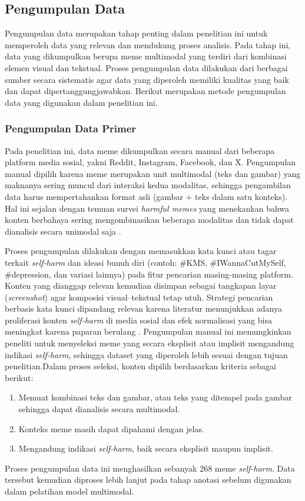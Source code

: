 \subsection{Pengumpulan Data} \label{subsec:pengumpulan_data}
Pengumpulan data merupakan tahap penting dalam penelitian ini untuk memperoleh data yang relevan dan mendukung proses analisis. Pada tahap ini, data yang dikumpulkan berupa meme multimodal yang terdiri dari kombinasi elemen visual dan tekstual. Proses pengumpulan data dilakukan dari berbagai sumber secara sistematis agar data yang diperoleh memiliki kualitas yang baik dan dapat dipertanggungjawabkan. Berikut merupakan metode pengumpulan data yang digunakan dalam penelitian ini.

\subsubsection{Pengumpulan Data Primer} \label{subsubsec:pengumpulan_data_primer}
Pada penelitian ini, data meme dikumpulkan secara manual dari beberapa platform media sosial, yakni Reddit, Instagram, Facebook, dan X. Pengumpulan manual dipilih karena meme merupakan unit multimodal (teks dan gambar) yang maknanya sering muncul dari interaksi kedua modalitas, sehingga pengambilan data harus mempertahankan format asli (gambar + teks dalam satu konteks). Hal ini sejalan dengan temuan survei \textit{harmful memes} yang menekankan bahwa konten berbahaya sering mengombinasikan beberapa modalitas dan tidak dapat dianalisis secara unimodal saja \cite{Sharma2022HarmfulMemes}.

Proses pengumpulan dilakukan dengan memasukkan kata kunci atau tagar terkait \textit{self-harm} dan ideasi bunuh diri (contoh: \#KMS, \#IWannaCutMySelf, \#depression, dan variasi lainnya) pada fitur pencarian masing-masing platform. Konten yang dianggap relevan kemudian disimpan sebagai tangkapan layar (\textit{screenshot}) agar komposisi visual--tekstual tetap utuh. Strategi pencarian berbasis kata kunci dipandang relevan karena literatur menunjukkan adanya proliferasi konten \textit{self-harm} di media sosial dan efek normalisasi yang bisa meningkat karena paparan berulang \cite{MoraledaEsteban2025SelfHarm}. Pengumpulan manual ini memungkinkan peneliti untuk menyeleksi meme yang secara eksplisit atau implisit mengandung indikasi \textit{self-harm}, sehingga dataset yang diperoleh lebih sesuai dengan tujuan penelitian.Dalam proses seleksi, konten dipilih berdasarkan kriteria sebagai berikut:
\begin{enumerate}
    \item Memuat kombinasi teks dan gambar, atau teks yang ditempel pada gambar sehingga dapat dianalisis secara multimodal.
    \item Konteks meme masih dapat dipahami dengan jelas.
    \item Mengandung indikasi \textit{self-harm}, baik secara eksplisit maupun implisit.
\end{enumerate}
Proses pengumpulan data ini menghasilkan sebanyak 268 meme \textit{self-harm}. Data tersebut kemudian diproses lebih lanjut pada tahap anotasi sebelum digunakan dalam pelatihan model multimodal.

